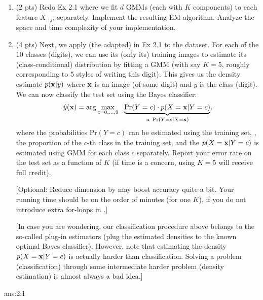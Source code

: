 \documentclass{tron}
\begin{document}
\begin{exercise}{}
\begin{enumerate}
		\ans{}
				
		\item (2 pts) Redo Ex 2.1 where we fit $d$ GMMs (each with $K$ components) to each feature $X_{:,j}$, separately. Implement the resulting EM algorithm. Analyze the space and time complexity of your implementation.
		
		\ans{}
		
		\item (4 pts) Next, we apply (the adapted)  in Ex 2.1 to the \href{https://pytorch.org/vision/0.9/datasets.html#mnist}{} dataset. For each of the 10 classes (digits), we can use its (only its) training images to estimate its (class-conditional) distribution by fitting a GMM (with say $K=5$, roughly corresponding to 5 styles of writing this digit). This gives us the density estimate $p(\mathbf{x} | y)$ where $\mathbf{x}$ is an image (of some digit) and $y$ is the class (digit). We can now classify the test set using the Bayes classifier:
		\begin{align}
		\hat y(\mathbf{x}) = \arg\max_{c = 0, \ldots, 9} ~~ \underbrace{\mathrm{Pr}(Y = c) \cdot p(X = \mathbf{x} | Y = c)}_{\propto ~\mathrm{Pr}(Y=c | X=\mathbf{x})},
		\end{align}
		where the probabilities $\mathrm{Pr}(Y = c)$ can be estimated using the training set, \eg, the proportion of the $c$-th class in the training set, and the  $p(X = \mathbf{x} | Y = c)$ is estimated using GMM for each class $c$ separately. Report your error rate on the test set as a function of $K$ (if time is a concern, using $K=5$ will receive  full credit). 
		
		[Optional: Reduce dimension by \href{https://en.wikipedia.org/wiki/Principal_component_analysis}{} may boost accuracy quite a bit. Your running time should be on the order of minutes (for one $K$), if you do not introduce extra for-loops in .]
		
		[In case you are wondering, our classification procedure above belongs to the so-called plug-in estimators (plug the estimated densities to the known optimal Bayes classifier). However, note that estimating the density $p(X=\mathbf{x} | Y = c)$ is actually harder than classification. Solving a problem (\eg classification) through some intermediate harder problem (\eg density estimation) is almost always a bad idea.]
		
		\ans{}
		

	\end{enumerate}	
\end{exercise}
\begin{answer}[TODO]{ans:2:1}
\end{answer}
\end{document}
